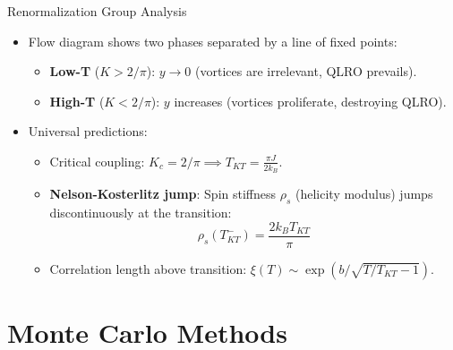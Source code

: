 \documentclass[11pt,aspectratio=169]{beamer}
\begin{document}
\begin{frame}{Renormalization Group Analysis}
    \begin{itemize}
        \item Flow diagram shows two phases separated by a line of fixed points:
        \begin{itemize}
            \item \textbf{Low-T} ($K > 2/\pi$): $y \to 0$ (vortices are irrelevant, QLRO prevails).
            \item \textbf{High-T} ($K < 2/\pi$): $y$ increases (vortices proliferate, destroying QLRO).
        \end{itemize}
        \pause
        \item Universal predictions:
        \begin{itemize}
            \item Critical coupling: $K_c = 2/\pi \implies T_{KT} = \frac{\pi J}{2k_B}$.
            \item \textbf{Nelson-Kosterlitz jump}: Spin stiffness $\rho_s$ (helicity modulus) jumps discontinuously at the transition:
            \begin{equation*}
                \rho_s(T_{KT}^-) = \frac{2k_B T_{KT}}{\pi}
            \end{equation*}
            \item Correlation length above transition: $\xi(T) \sim \exp(b/\sqrt{T/T_{KT}-1})$.
        \end{itemize}
    \end{itemize}
\end{frame}

\section{Monte Carlo Methods}
\end{document}

